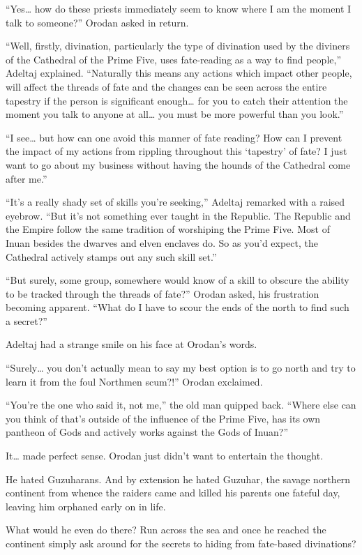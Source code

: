\documentclass[a4paper,10pt]{book}
\begin{document}
“Yes… how do these priests immediately seem to know where I am the moment I talk to someone?” Orodan asked in return.\par
“Well, firstly, divination, particularly the type of divination used by the diviners of the Cathedral of the Prime Five, uses fate-reading as a way to find people,” Adeltaj explained. “Naturally this means any actions which impact other people, will affect the threads of fate and the changes can be seen across the entire tapestry if the person is significant enough… for you to catch their attention the moment you talk to anyone at all… you must be more powerful than you look.”\par
“I see… but how can one avoid this manner of fate reading? How can I prevent the impact of my actions from rippling throughout this ‘tapestry’ of fate? I just want to go about my business without having the hounds of the Cathedral come after me.”\par
“It’s a really shady set of skills you’re seeking,” Adeltaj remarked with a raised eyebrow. “But it’s not something ever taught in the Republic. The Republic and the Empire follow the same tradition of worshiping the Prime Five. Most of Inuan besides the dwarves and elven enclaves do. So as you’d expect, the Cathedral actively stamps out any such skill set.”\par
“But surely, some group, somewhere would know of a skill to obscure the ability to be tracked through the threads of fate?” Orodan asked, his frustration becoming apparent. “What do I have to scour the ends of the north to find such a secret?”\par
Adeltaj had a strange smile on his face at Orodan’s words.\par
“Surely… you don’t actually mean to say my best option is to go north and try to learn it from the foul Northmen scum?!” Orodan exclaimed.\par
“You’re the one who said it, not me,” the old man quipped back. “Where else can you think of that’s outside of the influence of the Prime Five, has its own pantheon of Gods and actively works against the Gods of Inuan?”\par
It… made perfect sense. Orodan just didn’t want to entertain the thought.\par
He hated Guzuharans. And by extension he hated Guzuhar, the savage northern continent from whence the raiders came and killed his parents one fateful day, leaving him orphaned early on in life.\par
What would he even do there? Run across the sea and once he reached the continent simply ask around for the secrets to hiding from fate-based divinations?\par
\end{document}
